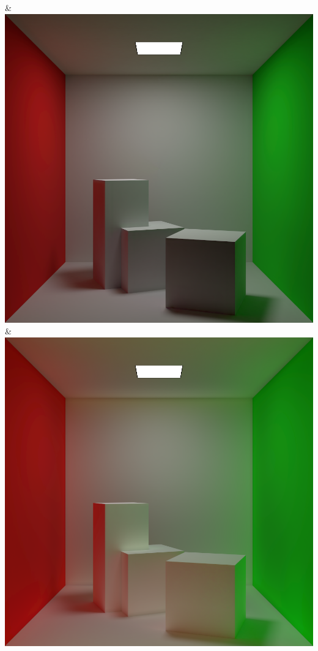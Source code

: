 & \includegraphics[width=\linewidth]{figures/py/tests/quality_comparison/nrc+pt_1min.png}
& \includegraphics[width=\linewidth]{figures/py/tests/quality_comparison/nrc+pt+sl_1min.png}
